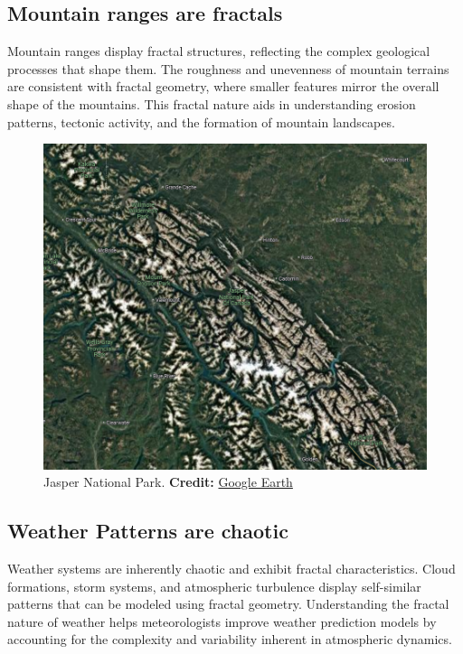 \documentclass[12pt]{article}
\begin{document}
\newpage

\subsection{Mountain ranges are fractals}
Mountain ranges display fractal structures, reflecting the complex geological processes that shape them. The roughness and unevenness of mountain terrains are consistent with fractal geometry, where smaller features mirror the overall shape of the mountains. This fractal nature aids in understanding erosion patterns, tectonic activity, and the formation of mountain landscapes.

\begin{figure}[H]
\centering
\includegraphics[width=\textwidth]{assets/fractal-jasper.png}
\caption{Jasper National Park. \textbf{Credit:} \href{https://earth.google.com/web/@53.07485662,-117.39830832,2023.01943478a,979415.30438438d,35y,0h,0t,0r/data=ChUaDwoJL20vMDFkcF9tGAEgAUICCAE6AwoBMEICCABKDQj___________8BEAA}{Google Earth}}
\label{fig:fractal-jasper}
\end{figure}

\newpage

\subsection{Weather Patterns are chaotic}
Weather systems are inherently chaotic and exhibit fractal characteristics. Cloud formations, storm systems, and atmospheric turbulence display self-similar patterns that can be modeled using fractal geometry. Understanding the fractal nature of weather helps meteorologists improve weather prediction models by accounting for the complexity and variability inherent in atmospheric dynamics.
\end{document}
